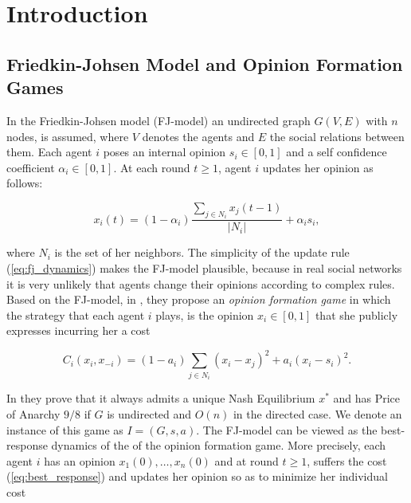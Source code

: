 \section{Introduction}

\subsection{Friedkin-Johsen Model and Opinion Formation Games}
In the Friedkin-Johsen model (FJ-model) an undirected graph $G(V,E)$ with $n$
nodes, is assumed, where $V$ denotes the agents and $E$ the social relations
between them. Each agent $i$ poses an internal opinion $s_i \in [0,1]$ and a self
confidence coefficient $\alpha_i \in[0,1]$. At each round $t \geq 1$,
agent $i$ updates her opinion as follows:

\begin{equation}\label{eq:fj_dynamics}
  x_i(t) = (1-\alpha_i) \frac{\sum_{j \in N_i}x_j(t-1)}{|N_i|} + \alpha_i s_i,
\end{equation}

where $N_i$ is the set of her neighbors. The simplicity of the update rule
(\ref{eq:fj_dynamics}) makes the FJ-model plausible, because in real social
networks it is very unlikely that agents change their opinions according
to complex rules.
Based on the FJ-model, in \cite{BKO11}, they propose an \emph{
  opinion formation game} in which the strategy that each agent
$i$ plays, is the opinion $x_i \in [0,1]$
that she publicly expresses incurring her a cost

\begin{equation}\label{eq:kleinberg_cost}
  C_i(x_i,x_{-i})=(1-a_i)\sum_{j \in N_i}(x_i -x_j)^2 + a_i(x_i-s_i)^2.
\end{equation}

In \cite{BK011} they prove that it always admits a unique
Nash Equilibrium $x^*$ and has Price of Anarchy $9/8$ if $G$ is
undirected and $O(n)$ in the directed case.  We denote an instance of this
game as $I=(G,s,a)$.
The FJ-model can be viewed as the best-response dynamics of the
of the opinion formation game.
%
More precisely, each agent $i$ has an opinion $x_1(0),\ldots,x_n(0)$ and
at round $t \geq 1$, suffers the cost (\ref{eq:best_response})
and updates her opinion so as to minimize her individual cost

